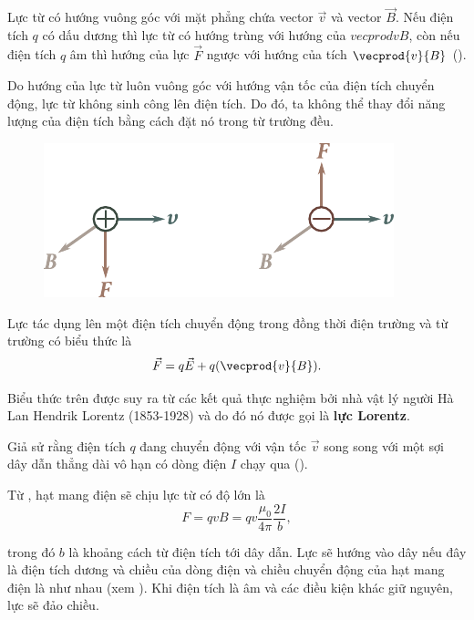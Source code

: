 Lực từ có hướng vuông góc với mặt phẳng chứa vector $\vec{v}$ và vector $\vec{B}$. Nếu điện tích $q$ có dấu dương thì lực từ có hướng trùng với hướng của $vecprod{v}{B}$, còn nếu điện tích $q$ âm thì hướng của lực $\vec{F}$ ngược với hướng của tích $\vecprod{v}{B}$ ().

Do hướng của lực từ luôn vuông góc với hướng vận tốc của điện tích chuyển động, lực từ không sinh công lên điện tích. Do đó, ta không thể thay đổi năng lượng của điện tích bằng cách đặt nó trong từ trường đều.

\begin{figure}[t]
	\begin{center}
		\includegraphics[scale=1]{figures/ch_06/fig_6_6.pdf}
		\caption[]{}
		\label{fig:6_6}
	\end{center}
	\vspace{-0.8cm}
\end{figure}

Lực tác dụng lên một điện tích chuyển động trong đồng thời điện trường và từ trường có biểu thức là
\begin{equation}\label{eq:6_35}
    \vec{F} = q \vec{E} + q (\vecprod{v}{B}).
\end{equation}

\noindent
Biểu thức trên được suy ra từ các kết quả thực nghiệm bởi nhà vật lý người Hà Lan Hendrik Lorentz (1853-1928) và do đó nó được gọi là \textbf{lực Lorentz}.

Giả sử rằng điện tích $q$ đang chuyển động với vận tốc $\vec{v}$ song song với một sợi dây dẫn thẳng dài vô hạn có dòng điện $I$ chạy qua ().

Từ , hạt mang điện sẽ chịu lực từ có độ lớn là 
\begin{equation}\label{eq:6_36}
    F = qvB = qv \frac{\mu_0}{4\pi} \frac{2I}{b},
\end{equation}

\noindent
trong đó $b$ là khoảng cách từ điện tích tới dây dẫn. Lực sẽ hướng vào dây nếu đây là điện tích dương và chiều của dòng điện và chiều chuyển động của hạt mang điện là như nhau (xem ). Khi điện tích là âm và các điều kiện khác giữ nguyên, lực sẽ đảo chiều.

